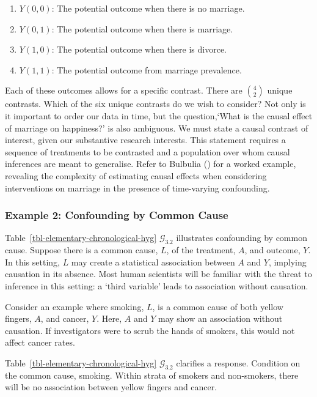 \documentclass[
  single column]{article}
\providecommand{\tightlist}{%
  \setlength{\itemsep}{0pt}\setlength{\parskip}{0pt}}\usepackage{longtable,booktabs,array}
\begin{document}
\begin{enumerate}
\def\labelenumi{\arabic{enumi}.}
\tightlist
\item
  \(Y(0, 0)\): The potential outcome when there is no marriage.
\item
  \(Y(0, 1)\): The potential outcome when there is marriage.
\item
  \(Y(1, 0)\): The potential outcome when there is divorce.
\item
  \(Y(1, 1)\): The potential outcome from marriage prevalence.
\end{enumerate}

Each of these outcomes allows for a specific contrast. There are
\(\binom{4}{2}\) unique contrasts. Which of the six unique contrasts do
we wish to consider? Not only is it important to order our data in time,
but the question,`What is the causal effect of marriage on happiness?'
is also ambiguous. We must state a causal contrast of interest, given
our substantive research interests. This statement requires a sequence
of treatments to be contrasted and a population over whom causal
inferences are meant to generalise. Refer to Bulbulia
() for a worked example,
revealing the complexity of estimating causal effects when considering
interventions on marriage in the presence of time-varying confounding.

\subsubsection{Example 2: Confounding by Common
Cause}\label{example-2-confounding-by-common-cause}

Table~\ref{tbl-elementary-chronological-hyg} \(\mathcal{G}_{3.2}\)
illustrates confounding by common cause. Suppose there is a common
cause, \(L\), of the treatment, \(A\), and outcome, \(Y\). In this
setting, \(L\) may create a statistical association between \(A\) and
\(Y\), implying causation in its absence. Most human scientists will be
familiar with the threat to inference in this setting: a `third
variable' leads to association without causation.

Consider an example where smoking, \(L\), is a common cause of both
yellow fingers, \(A\), and cancer, \(Y\). Here, \(A\) and \(Y\) may show
an association without causation. If investigators were to scrub the
hands of smokers, this would not affect cancer rates.

Table~\ref{tbl-elementary-chronological-hyg} \(\mathcal{G}_{3.2}\)
clarifies a response. Condition on the common cause, smoking. Within
strata of smokers and non-smokers, there will be no association between
yellow fingers and cancer.
\end{document}
